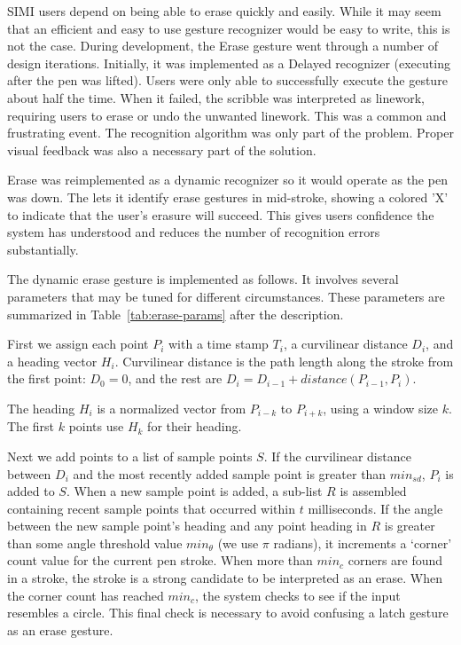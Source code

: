 


SIMI users depend on being able to erase quickly and easily. While it
may seem that an efficient and easy to use gesture recognizer would be
easy to write, this is not the case. During development, the Erase
gesture went through a number of design iterations. Initially, it was
implemented as a Delayed recognizer (executing after the pen was
lifted). Users were only able to successfully execute the gesture
about half the time. When it failed, the scribble was interpreted as
linework, requiring users to erase or undo the unwanted linework. This
was a common and frustrating event. The recognition algorithm was only
part of the problem. Proper visual feedback was also a necessary part
of the solution.

Erase was reimplemented as a dynamic recognizer so it would operate as
the pen was down. The lets it identify erase gestures in mid-stroke,
showing a colored 'X' to indicate that the user's erasure will
succeed. This gives users confidence the system has understood and
reduces the number of recognition errors substantially.

The dynamic erase gesture is implemented as follows. It involves
several parameters that may be tuned for different
circumstances. These parameters are summarized in
Table~\ref{tab:erase-params} after the description.

First we assign each point $P_i$ with a time stamp $T_i$, a
curvilinear distance $D_i$, and a heading vector $H_i$. Curvilinear
distance is the path length along the stroke from the first point:
$D_0=0$, and the rest are $D_i = D_{i-1} + distance(P_{i-1}, P_i)$.

The heading $H_i$ is a normalized vector from $P_{i-k}$ to $P_{i+k}$,
using a window size $k$. The first $k$ points use $H_k$ for their
heading.

Next we add points to a list of sample points $S$. If the curvilinear
distance between $D_i$ and the most recently added sample point is
greater than $min_{sd}$, $P_i$ is added to $S$. When a new sample
point is added, a sub-list $R$ is assembled containing recent sample
points that occurred within $t$ milliseconds. If the angle between the
new sample point's heading and any point heading in $R$ is greater
than some angle threshold value $min_\theta$ (we use $\pi$ radians),
it increments a `corner' count value for the current pen stroke. When
more than $min_c$ corners are found in a stroke, the stroke is a
strong candidate to be interpreted as an erase. When the corner count
has reached $min_c$, the system checks to see if the input resembles a
circle. This final check is necessary to avoid confusing a latch
gesture as an erase gesture. 

